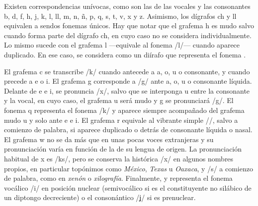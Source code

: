 

Existen correspondencias unívocas, como son las de las vocales y las consonantes  \textlangle{}b\textrangle{},  \textlangle{}d\textrangle{}, \textlangle{}f\textrangle{}, \textlangle{}h\textrangle{},  \textlangle{}j\textrangle{}, \textlangle{}k\textrangle{}, \textlangle{}l\textrangle{},  \textlangle{}ll\textrangle{}, \textlangle{}m\textrangle{}, \textlangle{}n\textrangle{},  \textlangle{}ñ\textrangle{}, \textlangle{}p\textrangle{}, \textlangle{}q\textrangle{},  \textlangle{}s\textrangle{}, \textlangle{}t\textrangle{}, \textlangle{}v\textrangle{},  \textlangle{}x\textrangle{} y \textlangle{}z\textrangle{}. Asimismo, los dígrafos \textlangle{}ch\textrangle{} y \textlangle{}ll\textrangle{} equivalen a sendos fonemas únicos. Hay que notar que el grafema \textlangle{}h\textrangle{} es mudo salvo cuando forma parte del dígrafo \textlangle{}ch\textrangle{}, en cuyo caso no se considera individualmente. Lo mismo sucede con el grafema \textlangle{}l\textrangle{} —equivale al fonema /l/— cuando aparece duplicado. En ese caso, se considera como un diírafo que representa el fonema .

El grafema \textlangle{}c\textrangle{} se transcribe /k/ cuando antecede a \textlangle{}a\textrangle{}, \textlangle{}o\textrangle{}, \textlangle{}u\textrangle{} o consonante, y  cuando precede a \textlangle{}e\textrangle{} o \textlangle{}i\textrangle{}. El grafema \textlangle{}g\textrangle{} corresponde a /g/ ante \textlangle{}a\textrangle{}, \textlangle{}o\textrangle{}, \textlangle{}u\textrangle{} o consonante líquida. Delante de \textlangle{}e\textrangle{} e \textlangle{}i\textrangle{}, se pronuncia /x/, salvo que se interponga \textlangle{}u\textrangle{} entre la consonante y la vocal, en cuyo caso, el grafema \textlangle{}u\textrangle{} será mudo y \textlangle{}g\textrangle{} se pronunciará /g/. El fonema  \textlangle{}q\textrangle{} representa el fonema /k/ y aparece siempre acompañado del grafema mudo \textlangle{}u\textrangle{} y solo ante \textlangle{}e\textrangle{} e \textlangle{}i\textrangle{}. El grafema \textlangle{}r\textrangle{} equivale al vibrante simple //, salvo a comienzo de palabra, si aparece duplicado o detrás de consonante líquida o nasal. El grafema \textlangle{}w\textrangle{} no se da más que en unas pocas voces extranjeras y su pronunciación varía en función de la de su lengua de origen. La pronunciación habitual de \textlangle{}x\textrangle{} es /ks/, pero se conserva la histórica /x/ en algunos nombres propios, en particular topónimos como \textit{México}, \textit{Texas} u \textit{Oaxaca}, y /s/ a comienzo de palabra, como en \textit{xenón} o \textit{xilografía}. Finalmente, \textlangle{}y\textrangle{} representa el fonema vocálico /i/ en posición nuclear (semivocálico si es el constituyente no silábico de un diptongo decreciente) o el consonántico /ʝ/ si es prenuclear.

